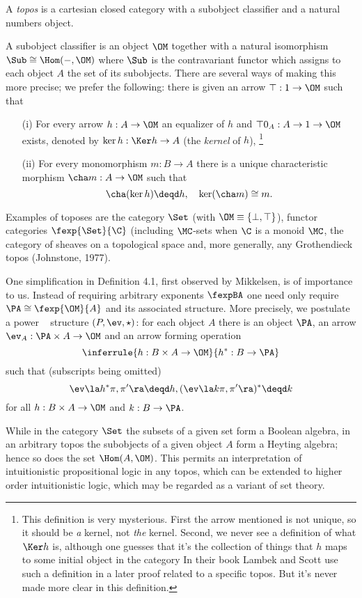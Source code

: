 \begin{defn}
A {\em topos} is a cartesian closed category with a subobject
classifier and a natural numbers object.

A subobject classifier is an object $\OM$ together with a natural
isomorphism $\Sub \cong \Hom(-, \OM)$ where $\Sub$ is the 
contravariant functor which
assigns to each object $A$ the set of its subobjects. There are several ways
of making this more precise; we prefer the following: there is given an arrow
$\top: 1 \to \OM$ such that
\begin{enumerate}
\item[(i)] For every arrow $h: A \to \OM$ an equalizer of $h$ and $\top 0_A: A \to 1 \to \OM$
exists, denoted by $\ker h: \Ker h \to A$ (the {\em kernel} of $h$),%
\footnote{This definition is very mysterious. First the arrow mentioned is not unique,
so it should be {\em a} kernel, not {\em the} kernel. Second, we never see a definition
of what $\Ker h$ is, although one guesses that it's the collection of things that $h$ maps
to some initial object in the category
In their book Lambek and Scott use such
a definition in a later proof related to a specific topos. 
But it's never made more clear in this definition.}
\item[(ii)] For every monomorphism $m: B \to A$ there is a unique characteristic
morphism $\cha m: A \to \OM$ such that
\[
\cha(\ker h) \deqd h, \quad \ker(\cha m) \cong m.
\]
\end{enumerate}
\end{defn}
Examples of toposes are the category $\Set$ (with $\OM \equiv \{\bot, \top\}$),
functor categories $\fexp{\Set}{\C}$ (including $\MC$-sets when $\C$ is 
a monoid $\MC$, the category of sheaves on a topological space and, 
more generally, any Grothendieck topos (Johnstone, 1977).

One simplification in Definition 4.1, first observed by Mikkelsen, is of
importance to us. Instead of requiring arbitrary exponents $\fexpBA$  one need only
require $\PA \cong \fexp{\OM}{A}$ and its associated structure.
More precisely, we postulate a power ~ structure $(P,\ev,\star)$: 
for each object $A$ there is an object $\PA$, an arrow $\ev_A : \PA \times A\to \OM$
and an arrow forming operation
\[
\inferrule{h: B \times A \to \OM}{h^*: B \to \PA}
\]
such that (subscripts being omitted)
\[
\ev\la h^* \pi,\pi'\ra \deqd h, (\ev\la k \pi,\pi'\ra)^* \deqd k 
\]
for all $h: B\times A \to \OM$ and $k: B \to \PA$.

While in the category $\Set$ the subsets of a given set form a Boolean
algebra, in an arbitrary topos the subobjects of a given object $A$ form a
Heyting algebra; hence so does the set $\Hom(A,\OM)$. This permits an 
interpretation of intuitionistic propositional logic in any topos, which can be
extended to higher order intuitionistic logic, which may be regarded as a
variant of set theory.

